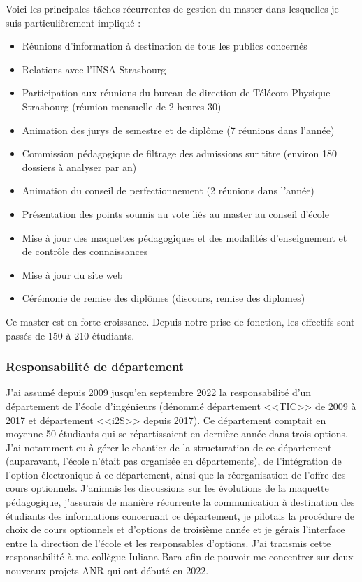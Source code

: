 \documentclass[a4paper,12pt]{article}
\begin{document}
Voici les principales tâches récurrentes de gestion du master dans lesquelles je suis particulièrement impliqué :
\begin{itemize}
    \item Réunions d’information à destination de tous les publics concernés
    \item Relations avec l'INSA Strasbourg
    \item Participation aux réunions du bureau de direction de Télécom Physique Strasbourg (réunion mensuelle de 2 heures 30)
    \item Animation des jurys de semestre et de diplôme (7 réunions dans l’année)
    \item Commission pédagogique de filtrage des admissions sur titre (environ 180 dossiers à analyser par an)
    \item Animation du conseil de perfectionnement (2 réunions dans l’année)
    \item Présentation des points soumis au vote liés au master au conseil d'école
    \item Mise à jour des maquettes pédagogiques et des modalités d'enseignement et de contrôle des connaissances
    \item Mise à jour du site web
    \item Cérémonie de remise des diplômes (discours, remise des diplomes)
\end{itemize}

Ce master est en forte croissance. Depuis notre prise de fonction, les effectifs sont passés de 150 à 210 étudiants.

\subsubsection{Responsabilité de département}

J’ai assumé depuis 2009 jusqu’en septembre 2022 la responsabilité d'un département de l'école d'ingénieurs (dénommé département <<TIC>> de 2009 à 2017 et département <<i2S>> depuis 2017). Ce département comptait en moyenne 50 étudiants qui se répartissaient en dernière année dans trois options. J’ai notamment eu à gérer le chantier de la structuration de ce département (auparavant, l'école n'était pas organisée en départements), de l’intégration de l’option électronique à ce département, ainsi que la réorganisation de l’offre des cours optionnels. J'animais les discussions sur les évolutions de la maquette pédagogique, j'assurais de manière récurrente la communication à destination des étudiants des informations concernant ce département, je pilotais la procédure de choix de cours optionnels et d’options de troisième année et je gérais l’interface entre la direction de l’école et les responsables d’options. J’ai transmis cette responsabilité à ma collègue Iuliana Bara afin de pouvoir me concentrer sur deux nouveaux projets ANR qui ont débuté en 2022.
\end{document}
